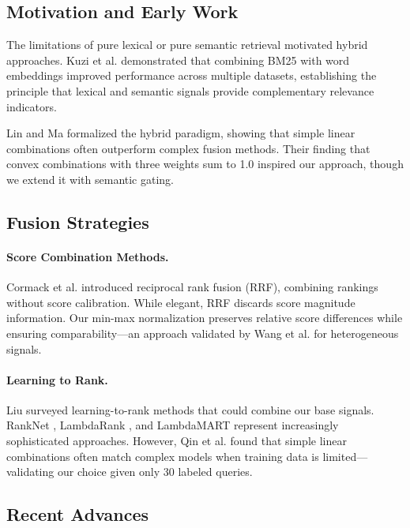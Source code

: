 \subsection{Motivation and Early Work}

The limitations of pure lexical or pure semantic retrieval motivated hybrid approaches. Kuzi et al. \cite{kuzi2020leveraging} demonstrated that combining BM25 with word embeddings improved performance across multiple datasets, establishing the principle that lexical and semantic signals provide complementary relevance indicators.

Lin and Ma \cite{lin2021pretrained} formalized the hybrid paradigm, showing that simple linear combinations often outperform complex fusion methods. Their finding that convex combinations with three weights sum to 1.0 inspired our approach, though we extend it with semantic gating.

\subsection{Fusion Strategies}

\paragraph{Score Combination Methods.} Cormack et al. \cite{cormack2009reciprocal} introduced reciprocal rank fusion (RRF), combining rankings without score calibration. While elegant, RRF discards score magnitude information. Our min-max normalization preserves relative score differences while ensuring comparability—an approach validated by Wang et al. \cite{wang2023improving} for heterogeneous signals.

\paragraph{Learning to Rank.} Liu \cite{liu2009learning} surveyed learning-to-rank methods that could combine our base signals. RankNet \cite{burges2005learning}, LambdaRank \cite{burges2006learning}, and LambdaMART \cite{wu2010adapting} represent increasingly sophisticated approaches. However, Qin et al. \cite{qin2021neural} found that simple linear combinations often match complex models when training data is limited—validating our choice given only 30 labeled queries.

\subsection{Recent Advances}

